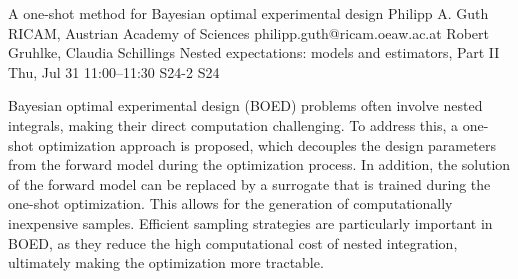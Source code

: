 \documentclass[12pt,lettersize,oneside]{book} %
\begin{document}
\begin{talk}
  {A one-shot method for Bayesian optimal experimental design}%
  {Philipp A. Guth}%
  {RICAM, Austrian Academy of Sciences}%
  {philipp.guth@ricam.oeaw.ac.at}%
  {Robert Gruhlke, Claudia Schillings}%
  {Nested expectations: models and estimators, Part II}%
  {Thu, Jul 31 11:00--11:30}%
  {S24-2}%
  {S24}%
    
  
Bayesian optimal experimental design (BOED) problems often involve nested integrals, making their direct computation challenging. To address this, a one-shot optimization approach is proposed, which decouples the design parameters from the forward model during the optimization process. In addition, the solution of the forward model can be replaced by a surrogate that is trained during the one-shot optimization. This allows for the generation of computationally inexpensive samples. Efficient sampling strategies are particularly important in BOED, as they reduce the high computational cost of nested integration, ultimately making the optimization more tractable.



%
%
\end{talk}
\end{document}
